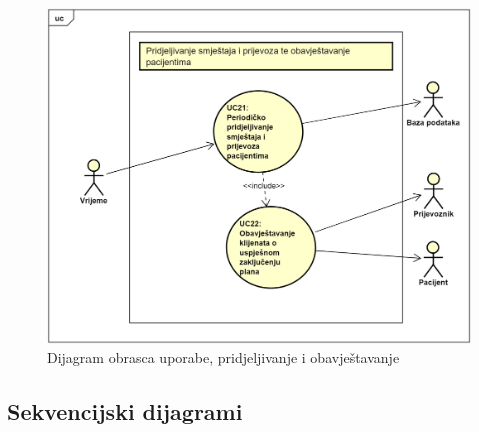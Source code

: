 				\begin{figure}[H]
					\centering
					\includegraphics[width=\textwidth]{slike/DOU_UC21UC22.png} %
					\caption{Dijagram obrasca uporabe, pridjeljivanje i obavještavanje}
					\label{fig:pridjeljivanje i obavještavanje}
				\end{figure}
				\eject		
				
			\subsection{Sekvencijski dijagrami}
